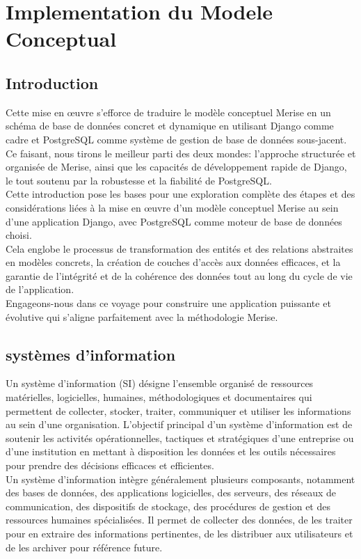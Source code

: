\chapter{Implementation du Modele Conceptual}
\section{Introduction}
Cette mise en œuvre s'efforce de traduire le modèle conceptuel Merise en un schéma de base de données concret et dynamique en utilisant Django comme cadre et PostgreSQL comme système de gestion de base de données sous-jacent.\\
Ce faisant, nous tirons le meilleur parti des deux mondes: l'approche structurée et organisée de Merise,
ainsi que les capacités de développement rapide de Django, le tout soutenu par la robustesse et la fiabilité de PostgreSQL.\\

Cette introduction pose les bases pour une exploration complète des étapes et des considérations liées à la mise en œuvre d'un modèle conceptuel Merise au sein d'une application Django, 
avec PostgreSQL comme moteur de base de données choisi. \\
Cela englobe le processus de transformation des entités et des relations abstraites en modèles concrets, 
la création de couches d'accès aux données efficaces, 
et la garantie de l'intégrité et de la cohérence des données tout au long du cycle de vie de l'application. \\
Engageons-nous dans ce voyage pour construire une application puissante et évolutive qui s'aligne parfaitement avec la méthodologie Merise.
\section{systèmes d'information}
Un système d'information (SI) désigne l'ensemble organisé de ressources matérielles, logicielles, humaines, méthodologiques et documentaires qui permettent de collecter, stocker, traiter, communiquer et utiliser les informations au sein d'une organisation. L'objectif principal d'un système d'information est de soutenir les activités opérationnelles, tactiques et stratégiques d'une entreprise ou d'une institution en mettant à disposition les données et les outils nécessaires pour prendre des décisions efficaces et efficientes.\\

Un système d'information intègre généralement plusieurs composants, notamment des bases de données, des applications logicielles, des serveurs, des réseaux de communication, des dispositifs de stockage, des procédures de gestion et des ressources humaines spécialisées. Il permet de collecter des données, de les traiter pour en extraire des informations pertinentes, de les distribuer aux utilisateurs et de les archiver pour référence future.\\


